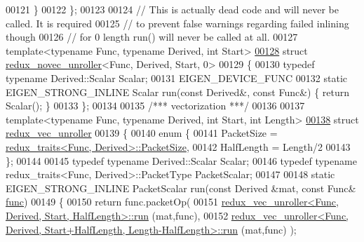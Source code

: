 \begin{DoxyCode}
00121   \}
00122 \};
00123 
00124 \textcolor{comment}{// This is actually dead code and will never be called. It is required}
00125 \textcolor{comment}{// to prevent false warnings regarding failed inlining though}
00126 \textcolor{comment}{// for 0 length run() will never be called at all.}
00127 \textcolor{keyword}{template}<\textcolor{keyword}{typename} Func, \textcolor{keyword}{typename} Derived, \textcolor{keywordtype}{int} Start>
\hyperlink{struct_eigen_1_1internal_1_1redux__novec__unroller_3_01_func_00_01_derived_00_01_start_00_010_01_4}{00128} \textcolor{keyword}{struct }\hyperlink{struct_eigen_1_1internal_1_1redux__novec__unroller}{redux\_novec\_unroller}<Func, Derived, Start, 0>
00129 \{
00130   \textcolor{keyword}{typedef} \textcolor{keyword}{typename} Derived::Scalar Scalar;
00131   EIGEN\_DEVICE\_FUNC 
00132   \textcolor{keyword}{static} EIGEN\_STRONG\_INLINE Scalar run(\textcolor{keyword}{const} Derived&, \textcolor{keyword}{const} Func&) \{ \textcolor{keywordflow}{return} Scalar(); \}
00133 \};
00134 
00135 \textcolor{comment}{/*** vectorization ***/}
00136 
00137 \textcolor{keyword}{template}<\textcolor{keyword}{typename} Func, \textcolor{keyword}{typename} Derived, \textcolor{keywordtype}{int} Start, \textcolor{keywordtype}{int} Length>
\hyperlink{struct_eigen_1_1internal_1_1redux__vec__unroller}{00138} \textcolor{keyword}{struct }\hyperlink{struct_eigen_1_1internal_1_1redux__vec__unroller}{redux\_vec\_unroller}
00139 \{
00140   \textcolor{keyword}{enum} \{
00141     PacketSize = \hyperlink{struct_eigen_1_1internal_1_1redux__traits}{redux\_traits<Func, Derived>::PacketSize},
00142     HalfLength = Length/2
00143   \};
00144 
00145   \textcolor{keyword}{typedef} \textcolor{keyword}{typename} Derived::Scalar Scalar;
00146   \textcolor{keyword}{typedef} \textcolor{keyword}{typename} redux\_traits<Func, Derived>::PacketType PacketScalar;
00147 
00148   \textcolor{keyword}{static} EIGEN\_STRONG\_INLINE PacketScalar run(\textcolor{keyword}{const} Derived &mat, \textcolor{keyword}{const} Func& 
      \hyperlink{structfunc}{func})
00149   \{
00150     \textcolor{keywordflow}{return} func.packetOp(
00151             \hyperlink{struct_eigen_1_1internal_1_1redux__vec__unroller}{redux\_vec\_unroller<Func, Derived, Start, HalfLength>::run}
      (mat,func),
00152             
      \hyperlink{struct_eigen_1_1internal_1_1redux__vec__unroller}{redux\_vec\_unroller<Func, Derived, Start+HalfLength, Length-HalfLength>::run}
      (mat,func) );

\end{DoxyCode}
